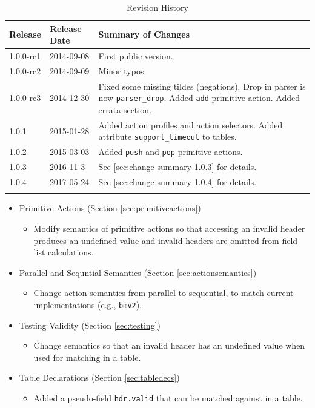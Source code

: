 \documentclass[12pt]{article}
\begin{document}
\begin{table}[H]
\begin{center}
\begin{tabular}{| l | l | p{} |} \hline
\textbf{Release} &
\textbf{Release Date} &
\textbf{Summary of Changes} \\  \hline
1.0.0-rc1 & 2014-09-08 & First public version. \\  \hline
1.0.0-rc2 & 2014-09-09 & Minor typos. \\  \hline
1.0.0-rc3 & 2014-12-30 & Fixed some missing tildes (negations). Drop in parser is now \texttt{parser_drop}. Added \texttt{add} primitive action. Added errata section. \\  \hline
1.0.1 & 2015-01-28 & Added action profiles and action selectors. Added attribute \texttt{support_timeout} to tables. \\  \hline
1.0.2 & 2015-03-03 & Added \texttt{push} and \texttt{pop} primitive actions. \\  \hline
1.0.3 & 2016-11-3 & See \ref{sec:change-summary-1.0.3} for details. \\ \hline
1.0.4 & 2017-05-24 & See \ref{sec:change-summary-1.0.4} for details. \\ \hline
}
\end{tabular}
\end{center}
\caption{Revision History}
\label{tab:revhistory}
\end{table}


\begin{itemize}
\item Primitive Actions (Section \ref{sec:primitiveactions})
\begin{itemize}
\item Modify semantics of primitive actions so that accessing an invalid header produces an undefined value and invalid headers are omitted from field list calculations.
\end{itemize}
\item Parallel and Sequntial Semantics (Section \ref{sec:actionsemantics})
\begin{itemize}
\item Change action semantics from parallel to sequential, to match current implementations (e.g., \texttt{bmv2}).
\end{itemize}
\item Testing Validity (Section \ref{sec:testing})
\begin{itemize}
\item Change semantics so that an invalid header has an undefined value when used for matching in a table.
\end{itemize}
\item Table Declarations (Section \ref{sec:tabledecs})
\begin{itemize}
\item Added a pseudo-field \texttt{hdr.valid} that can be matched against in a table.
\end{itemize}
\end{itemize}
\end{document}

